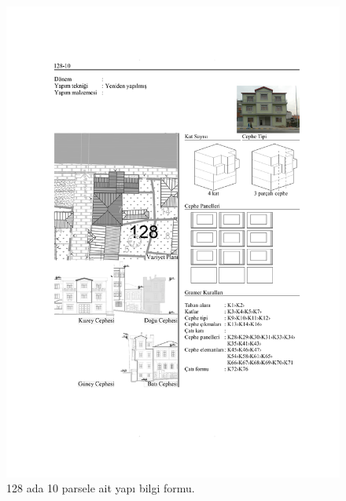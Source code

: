\begin{figure}
\centering
\includegraphics[width=1\textwidth,height=\textheight]{source/figures/BilgiFormlari/128-10.pdf}
\caption{128 ada 10 parsele ait yapı bilgi formu.}
\end{figure}


